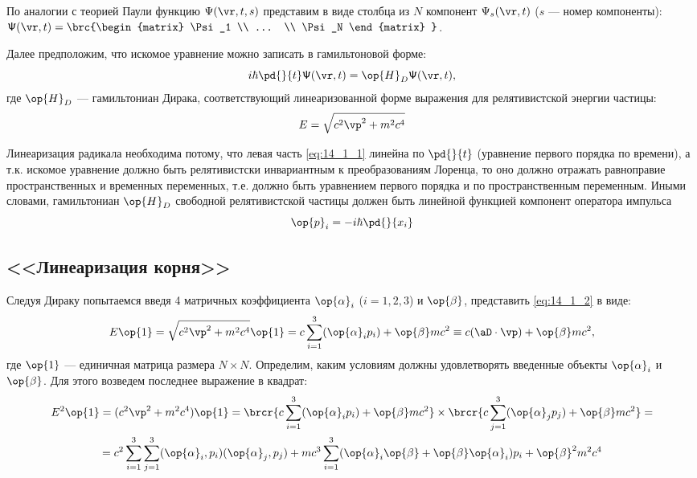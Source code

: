 По аналогии с теорией Паули функцию $\Psi(\vr, t, s)$ представим в виде столбца из $N$ компонент $\Psi_s(\vr, t)$ ($s$ --- номер компоненты): $\mathsf{\Psi}(\vr, t) = 
\brc{\begin{matrix}
\Psi_1 \\
... \\
\Psi_N
\end{matrix} }
$.

Далее предположим, что искомое уравнение можно записать в гамильтоновой форме:
\begin{equation}
\label{eq:14_1_1}
i\hbar \pd{}{t} \mathsf{\Psi}(\vr, t) = \op{H}_D \mathsf{\Psi}(\vr, t),
\end{equation}
где $\op{H}_D$ --- гамильтониан Дирака, соответствующий линеаризованной форме выражения для релятивистской энергии частицы:
\begin{equation}
\label{eq:14_1_2}
E = \sqrt{c^2 \vp^2 + m^2 c^4}
\end{equation}
 
Линеаризация радикала необходима потому, что левая часть \eqref{eq:14_1_1} линейна по $\pd{}{t}$ (уравнение первого порядка по времени), а т.к. искомое уравнение должно быть релятивистски инвариантным к преобразованиям Лоренца, то оно должно отражать равноправие пространственных и временных переменных, т.е. должно быть уравнением первого порядка и по пространственным переменным. Иными словами, гамильтониан $\op{H}_D$ свободной релятивистской частицы должен быть линейной функцией компонент оператора импульса 
$$
\op{p}_i = - i\hbar \pd{}{x_i}
$$

\subsection{<<Линеаризация корня>>}

Следуя Дираку попытаемся введя 4 матричных коэффициента $\op{\alpha}_i$ ($i = 1, 2, 3$) и $\op{\beta}$, представить \eqref{eq:14_1_2} в виде:
\begin{equation}
\label{eq:14_1_3}
E \op{1} = \sqrt{c^2 \vp^2 + m^2 c^4} \op{1} = c \sum_{i=1}^3 (\op{\alpha}_i p_i) + \op{\beta} mc^2 \equiv c(\aD \cdot \vp) + \op{\beta} mc^2,
\end{equation}
где $\op{1}$ --- единичная матрица размера $N \times N$. Определим, каким условиям должны удовлетворять введенные объекты $\op{\alpha}_i$ и $\op{\beta}$. Для этого возведем последнее выражение в квадрат:
\begin{gather}
E^2 \op{1} = (c^2 \vp^2 + m^2 c^4)\op{1} = \brcr{c \sum_{i=1}^3 (\op{\alpha}_i p_i) + \op{\beta} mc^2} \times \brcr{c \sum_{j=1}^3 (\op{\alpha}_j p_j) + \op{\beta} mc^2} = \nonumber \\
\label{eq:14_1_4}
= {c^2 \sum_{i=1}^3 \sum_{j = 1}^3 (\op{\alpha}_i, p_i)(\op{\alpha}_j, p_j)} + mc^3 \sum_{i=1}^3 (\op{\alpha}_i \op{\beta} + \op{\beta} \op{\alpha}_i) p_i + \op{\beta}^2 m^2 c^4
\end{gather}


